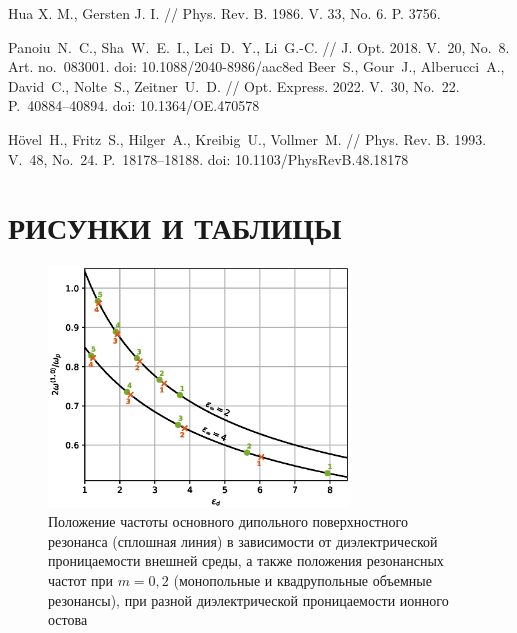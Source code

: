 \documentclass[12pt, a4paper]{article}
\begin{document}
\begin{thebibliography}{99}
Hua X. M., Gersten J. I. // Phys. Rev. B. 1986. V. 33, No. 6. P. 3756.


Panoiu~N.~C., Sha~W.~E.~I., Lei~D.~Y., Li~G.-C. // J. Opt. 2018. V.~20, No.~8. Art. no.~083001. doi: 10.1088/2040-8986/aac8ed
Beer~S., Gour~J., Alberucci~A., David~C., Nolte~S., Zeitner~U.~D. // Opt. Express. 2022. V.~30, No.~22. P.~40884--40894. doi: 10.1364/OE.470578

H\"{o}vel~H., Fritz~S., Hilger~A., Kreibig~U., Vollmer~M. // Phys. Rev. B. 1993. V.~48, No.~24. P.~18178--18188. doi: 10.1103/PhysRevB.48.18178

\end{thebibliography}

\newpage
\section{РИСУНКИ И ТАБЛИЦЫ}
\begin{figure}[h]
	\centering
	\includegraphics[width=80mm]{./image/fig_w.eps}
	\caption{Положение частоты основного дипольного поверхностного резонанса (сплошная линия) в зависимости от диэлектрической проницаемости внешней среды, а также положения резонансных частот при $m=0,2$ (монопольные и квадрупольные объемные резонансы), при разной диэлектрической проницаемости ионного остова}
	\label{fig_w}
\end{figure} 
\newpage
\end{document}
